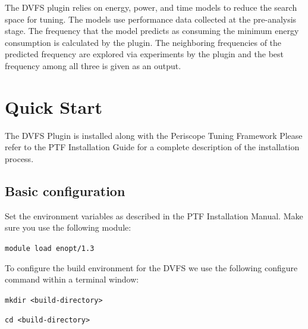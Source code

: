 \documentclass[11pt,a4paper, oneside]{book} %
\begin{document}
The DVFS plugin relies on energy, power, and time models to reduce the search space for tuning.
The models use performance data collected at the pre-analysis stage. The frequency that the model predicts as consuming the minimum energy consumption is calculated by the plugin.
The neighboring frequencies of the predicted frequency are explored via experiments by the plugin and the best frequency among all three is given as an output.

\chapter{Quick Start}
The DVFS Plugin is installed along with the Periscope Tuning Framework Please refer to the PTF Installation Guide for a complete description of the installation process.

%
  \section{Basic configuration}
  Set the environment variables as described in the PTF Installation Manual. Make sure you use the following module:

\texttt{module load enopt/1.3}

  To configure the build environment for the DVFS we use the following configure command within a terminal window:

  \texttt{mkdir <build-directory>}

  \texttt{cd <build-directory>}
\end{document}
